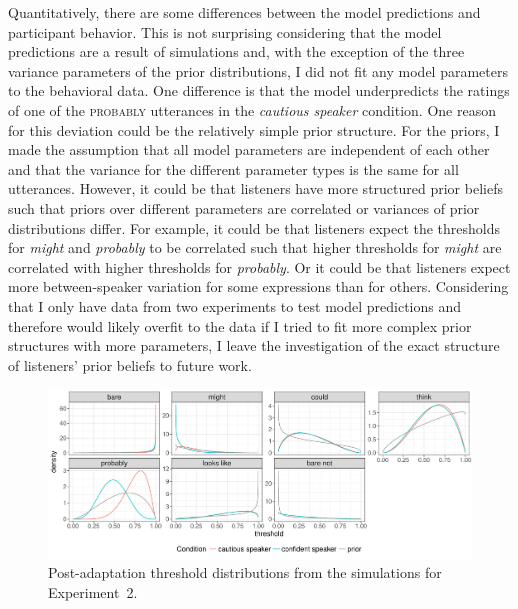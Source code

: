 Quantitatively, there are some differences between the model predictions and participant behavior. This is not surprising considering that the model predictions are a result of simulations
and, with the exception of the three variance parameters of the prior distributions, I did not fit any model parameters to the behavioral data. One difference is that the model underpredicts 
the ratings of one of the  \textsc{probably} utterances in the \textit{cautious speaker} condition.
 One reason for this deviation could be the relatively simple prior structure. For the priors, I made the assumption that all model parameters are independent of each other and 
that the variance for the different parameter types is the same for all utterances. However, it could be that listeners have more structured prior beliefs such that priors over different parameters are correlated or
variances of prior distributions differ. For example, it could be that listeners expect the thresholds for \textit{might} and \textit{probably} to be correlated such that higher thresholds for \textit{might} are correlated 
with higher thresholds for \textit{probably}. Or it could be that listeners expect more between-speaker variation for some expressions than for others. Considering that I only have data from two experiments to test
model predictions and therefore would likely overfit to the data if I tried to fit more complex prior structures with more parameters, I leave the investigation of the exact structure of listeners' prior beliefs to future work.

\begin{figure}
  \includegraphics[width=\textwidth]{plots/fig-11-adaptation-posterior-thresholds-replication.pdf}
  \caption{Post-adaptation threshold distributions from the simulations for Experiment~2. \label{fig:post-exposure-thresholds}}
\end{figure}





